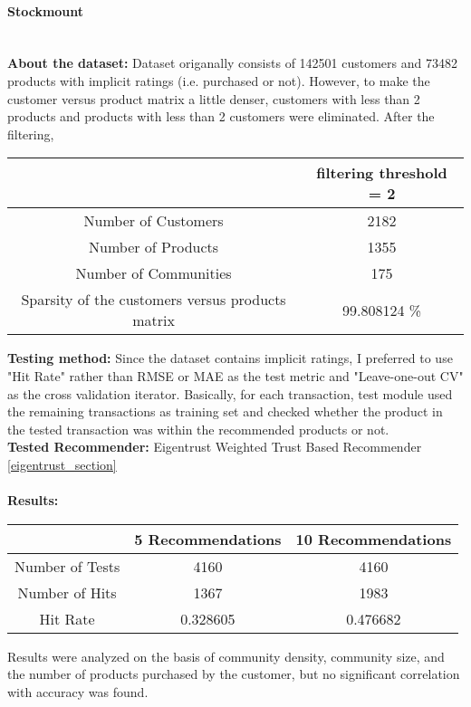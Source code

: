 \paragraph{Stockmount} \mbox{}\\
\textbf{About the dataset:} Dataset origanally consists of 142501 customers and 73482 products with implicit ratings (i.e. purchased or not). However, to make the customer versus product matrix a little denser, customers with less than 2 products and products with less than 2 customers were eliminated. After the filtering,
\begin{center}
	\begin{tabular}{ | c | c |}
		\hline
		& filtering threshold = 2\\ 
		\hline
		Number of Customers & 2182\\  
		\hline
		Number of Products & 1355\\  
		\hline
		Number of Communities & 175\\  
		\hline
		Sparsity of the customers versus products matrix & 99.808124 \% \\   
		\hline
	\end{tabular}
\end{center} 
\vspace{0.5cm}
\textbf{Testing method:} Since the dataset contains implicit ratings, I preferred to use "Hit Rate" rather than RMSE or MAE as the test metric and "Leave-one-out CV" as the cross validation iterator. Basically, for each transaction, test module used the remaining transactions as training set and checked whether the product in the tested transaction was within the recommended products or not.\\
\textbf{Tested Recommender:} Eigentrust Weighted Trust Based Recommender \ref{eigentrust_section} \\ \\
\textbf{Results:}
\begin{center}
	\begin{tabular}{ | c | c | c |}
		\hline
		& 5 Recommendations & 10 Recommendations\\ 
		\hline
		Number of Tests&  4160 & 4160\\  
		\hline
		Number of Hits&  1367 & 1983\\  
		\hline
		Hit Rate &   0.328605 & 0.476682\\  
		\hline
	\end{tabular}
\end{center} 
Results were analyzed on the basis of community density, community size, and the number of products purchased by the customer, but no significant correlation with accuracy was found.

